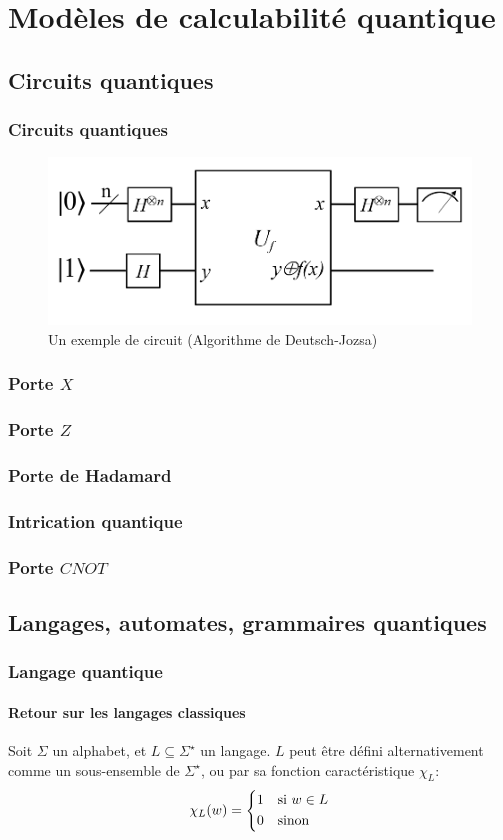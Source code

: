 \documentclass[aspectratio=169]{beamer}
\theoremstyle{plain}
\theoremstyle{definition}
\begin{document}
\section{Modèles de calculabilité quantique}
\subsection{Circuits quantiques}
\begin{frame}
    \frametitle{Circuits quantiques}
    \begin{figure}[!ht]
        \centering
        \includegraphics[scale=0.4]{deutsch-circuit-n.png}
        \caption{Un exemple de circuit (Algorithme de Deutsch-Jozsa)}
    \end{figure}
\end{frame}

\begin{frame}
    \frametitle{Porte $X$}
\end{frame}

\begin{frame}
    \frametitle{Porte $Z$}
\end{frame}

\begin{frame}
    \frametitle{Porte de Hadamard}
\end{frame}

\begin{frame}
    \frametitle{Intrication quantique}
\end{frame}

\begin{frame}
    \frametitle{Porte $CNOT$}
\end{frame}

\subsection{Langages, automates, grammaires quantiques}
\begin{frame}
    \frametitle{Langage quantique}
    \framesubtitle{Retour sur les langages classiques}
    Soit $\Sigma$ un alphabet, et $L\subseteq \Sigma^\star$ un langage. $L$ peut être défini alternativement comme un sous-ensemble de $\Sigma^\star$, ou par sa fonction caractéristique $\chi_L$:
    \begin{equation*}
        \chi_L(w) = \begin{cases*}
            1 & si $w\in L$\\
            0 & sinon
        \end{cases*}
    \end{equation*}
\end{frame}
\end{document}
